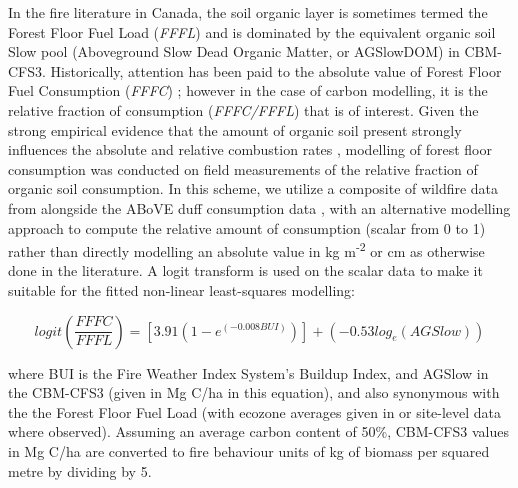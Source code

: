 \documentclass[, manuscript]{copernicus}
\begin{document}
In the fire literature in Canada, the soil organic layer is sometimes
termed the Forest Floor Fuel Load (\emph{FFFL}) \citep{letang2012} and
is dominated by the equivalent organic soil Slow pool (Aboveground Slow
Dead Organic Matter, or AGSlowDOM) in CBM-CFS3. Historically, attention
has been paid to the absolute value of Forest Floor Fuel Consumption
(\emph{FFFC})
\citep{forestrycanadafiredangerratinggroup1992, degroot2009}; however in
the case of carbon modelling, it is the relative fraction of consumption
(\emph{FFFC/FFFL}) that is of interest. Given the strong empirical
evidence that the amount of organic soil present strongly influences the
absolute and relative combustion rates
\citep{walkerFuelAvailabilityNot2020}, modelling of forest floor
consumption was conducted on field measurements of the relative fraction
of organic soil consumption. In this scheme, we utilize a composite of
wildfire data from \citep{degroot2009} alongside the ABoVE duff
consumption data \citep{walker2020}, with an alternative modelling
approach to compute the relative amount of consumption (scalar from 0 to
1) rather than directly modelling an absolute value in kg
m\textsuperscript{-2} or cm as otherwise done in the literature. A logit
transform is used on the scalar data to make it suitable for the fitted
non-linear least-squares modelling:

\begin{equation}
logit \left( \frac{FFFC}{FFFL}\right) = [3.91(1 - e^{(-0.008BUI)})] + (-0.53log_{e}(AGSlow))
\end{equation}

where BUI is the Fire Weather Index System's Buildup Index, and AGSlow
in the CBM-CFS3 (given in Mg C/ha in this equation), and also synonymous
with the the Forest Floor Fuel Load (with ecozone averages given in
\citep{letang2012} or site-level data where observed). Assuming an
average carbon content of 50\%, CBM-CFS3 values in Mg C/ha are converted
to fire behaviour units of kg of biomass per squared metre by dividing
by 5.
\end{document}
